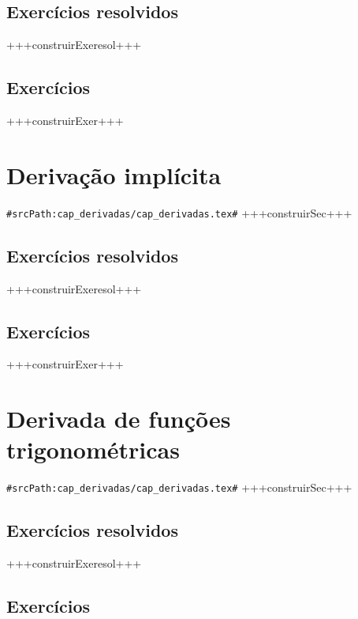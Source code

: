 \subsection*{Exercícios resolvidos}

+++construirExeresol+++


\subsection*{Exercícios}

+++construirExer+++


\section{Derivação implícita}
\verb+#srcPath:cap_derivadas/cap_derivadas.tex#+
+++construirSec+++

\subsection*{Exercícios resolvidos}

+++construirExeresol+++


\subsection*{Exercícios}

+++construirExer+++


\section{Derivada de funções trigonométricas}
\verb+#srcPath:cap_derivadas/cap_derivadas.tex#+
+++construirSec+++

\subsection*{Exercícios resolvidos}

+++construirExeresol+++


\subsection*{Exercícios}

